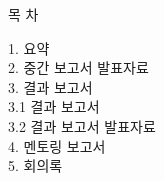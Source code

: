 
\begin{titlepage}
\thispagestyle{empty}

\centering

\vspace{1cm}

\Huge 목 차

\vspace{2.5cm}

\begin{flushleft}
\Large 1. 요약 \\
\vspace{0.6cm}
2. 중간 보고서 발표자료 \\
\vspace{0.6cm}
3. 결과 보고서 \\
\hspace{0.6cm}
3.1 결과 보고서 \\
\hspace{0.6cm}
3.2 결과 보고서 발표자료 \\
\vspace{0.6cm}
4. 멘토링 보고서 \\
\vspace{0.6cm}
5. 회의록 \\
\vspace{1cm}
\end{flushleft}

\end{titlepage}